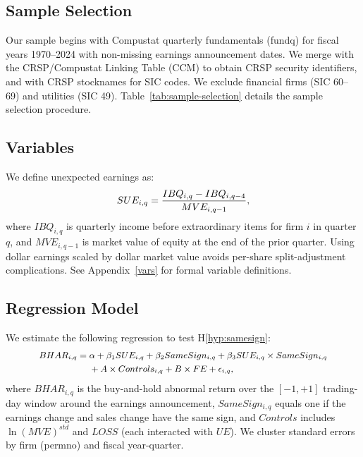 \documentclass[english,authoryear,IEEEtran,12pt]{article}
\begin{document}
\subsection{Sample Selection}

Our sample begins with Compustat quarterly fundamentals (fundq) for fiscal years 1970--2024 with non-missing earnings announcement dates. We merge with the CRSP/Compustat Linking Table (CCM) to obtain CRSP security identifiers, and with CRSP stocknames for SIC codes. We exclude financial firms (SIC 60--69) and utilities (SIC 49). Table~\ref{tab:sample-selection} details the sample selection procedure.

\subsection{Variables}

We define unexpected earnings as:
\begin{equation}\small \label{eq:ue}
SUE_{i,q} = \frac{IBQ_{i,q} - IBQ_{i,q-4}}{MVE_{i,q-1}},
\end{equation}
where $IBQ_{i,q}$ is quarterly income before extraordinary items for firm $i$ in quarter $q$, and $MVE_{i,q-1}$ is market value of equity at the end of the prior quarter. Using dollar earnings scaled by dollar market value avoids per-share split-adjustment complications. See Appendix~\ref{vars} for formal variable definitions.

\subsection{Regression Model}

We estimate the following regression to test H\ref{hyp:samesign}:
\begin{equation}\small \label{eq:regression}
\begin{aligned}
    BHAR_{i,q} = {} & \alpha + \beta_1 SUE_{i,q} + \beta_2 SameSign_{i,q} + \beta_3 SUE_{i,q} \times SameSign_{i,q} \\
    & + A \times Controls_{i,q} + B \times FE + \epsilon_{i,q},
\end{aligned}
\end{equation}
where $BHAR_{i,q}$ is the buy-and-hold abnormal return over the $[-1,+1]$ trading-day window around the earnings announcement, $SameSign_{i,q}$ equals one if the earnings change and sales change have the same sign, and $Controls$ includes $\ln(MVE)^{std}$ and $LOSS$ (each interacted with $UE$). We cluster standard errors by firm (permno) and fiscal year-quarter.
\end{document}
